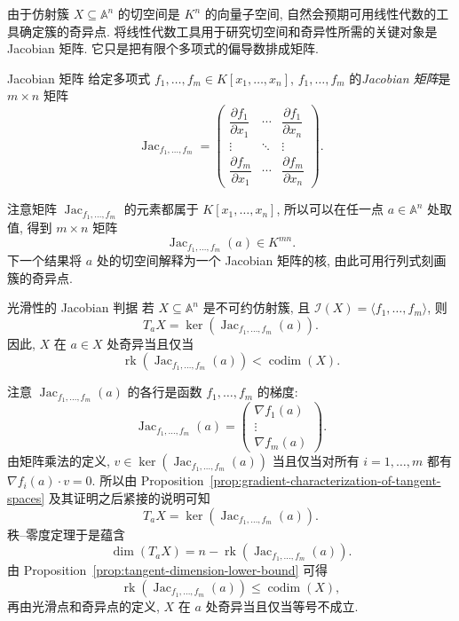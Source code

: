 由于仿射簇 $X\subseteq\mathbb{A}^{n}$ 的切空间是 $K^{n}$ 的向量子空间, 自然会预期可用线性代数的工具确定簇的奇异点. 将线性代数工具用于研究切空间和奇异性所需的关键对象是 Jacobian 矩阵. 它只是把有限个多项式的偏导数排成矩阵.

\begin{Definition}{Jacobian 矩阵}\leavevmode\label{def:jacobian-matrix}
给定多项式 $f_{1},\ldots,f_{m}\in K[x_{1},\ldots,x_{n}]$, $f_{1},\ldots,f_{m}$ 的\emph{Jacobian 矩阵}是 $m\times n$ 矩阵
\[
  \operatorname{Jac}_{f_{1},\ldots,f_{m}}=
  \begin{pmatrix}
    \dfrac{\partial f_{1}}{\partial x_{1}} & \cdots & \dfrac{\partial f_{1}}{\partial x_{n}}\\
    \vdots & \ddots & \vdots\\
    \dfrac{\partial f_{m}}{\partial x_{1}} & \cdots & \dfrac{\partial f_{m}}{\partial x_{n}}
  \end{pmatrix}.
\]
\end{Definition}

注意矩阵 $\operatorname{Jac}_{f_{1},\ldots,f_{m}}$ 的元素都属于 $K[x_{1},\ldots,x_{n}]$, 所以可以在任一点 $a\in\mathbb{A}^{n}$ 处取值, 得到 $m\times n$ 矩阵
\[
  \operatorname{Jac}_{f_{1},\ldots,f_{m}}(a)\in K^{mn}.
\]
下一个结果将 $a$ 处的切空间解释为一个 Jacobian 矩阵的核, 由此可用行列式刻画簇的奇异点.

\begin{Proposition}{光滑性的 Jacobian 判据}\leavevmode\label{prop:jacobian-criterion-for-smoothness}
若 $X\subseteq\mathbb{A}^{n}$ 是不可约仿射簇, 且 $\mathcal{I}(X)=\langle f_{1},\ldots,f_{m}\rangle$, 则
\[
  T_{a}X=\ker(\operatorname{Jac}_{f_{1},\ldots,f_{m}}(a)).
\]
因此, $X$ 在 $a\in X$ 处奇异当且仅当
\[
  \operatorname{rk}(\operatorname{Jac}_{f_{1},\ldots,f_{m}}(a))<\operatorname{codim}(X).
\]
\end{Proposition}
\begin{Proof}
注意 $\operatorname{Jac}_{f_{1},\ldots,f_{m}}(a)$ 的各行是函数 $f_{1},\ldots,f_{m}$ 的梯度:
\[
  \operatorname{Jac}_{f_{1},\ldots,f_{m}}(a)=
  \begin{pmatrix}
    \nabla f_{1}(a)\\
    \vdots\\
    \nabla f_{m}(a)
  \end{pmatrix}.
\]
由矩阵乘法的定义, $v\in\ker(\operatorname{Jac}_{f_{1},\ldots,f_{m}}(a))$ 当且仅当对所有 $i=1,\ldots,m$ 都有 $\nabla f_{i}(a)\cdot v=0$. 所以由 Proposition~\ref{prop:gradient-characterization-of-tangent-spaces} 及其证明之后紧接的说明可知
\[
  T_{a}X=\ker(\operatorname{Jac}_{f_{1},\ldots,f_{m}}(a)).
\]
秩--零度定理于是蕴含
\[
  \dim(T_{a}X)=n-\operatorname{rk}(\operatorname{Jac}_{f_{1},\ldots,f_{m}}(a)).
\]
由 Proposition~\ref{prop:tangent-dimension-lower-bound} 可得
\[
  \operatorname{rk}(\operatorname{Jac}_{f_{1},\ldots,f_{m}}(a))\leq\operatorname{codim}(X),
\]
再由光滑点和奇异点的定义, $X$ 在 $a$ 处奇异当且仅当等号不成立.
\end{Proof}

